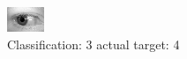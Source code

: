 \begin{figure}[h!]
\begin{center}
\includegraphics[width=0.60\columnwidth]{figures/ID746_class_3_target_4.png}
\end{center}
\caption{ Classification: 3 actual target: 4}
\label{fig:ID746_class_3_target_4}
\end{figure}
